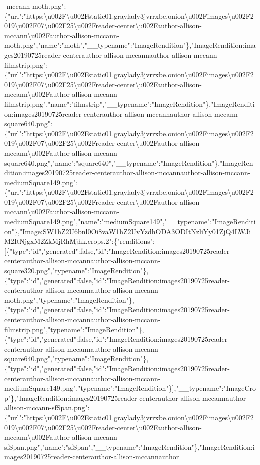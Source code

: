 -mccann-moth.png":\{"url":"https:\textbackslash{}u002F\textbackslash{}u002Fstatic01.graylady3jvrrxbe.onion\textbackslash{}u002Fimages\textbackslash{}u002F2019\textbackslash{}u002F07\textbackslash{}u002F25\textbackslash{}u002Freader-center\textbackslash{}u002Fauthor-allison-mccann\textbackslash{}u002Fauthor-allison-mccann-moth.png","name":"moth","\_\_typename":"ImageRendition"\},"ImageRendition:images20190725reader-centerauthor-allison-mccannauthor-allison-mccann-filmstrip.png":\{"url":"https:\textbackslash{}u002F\textbackslash{}u002Fstatic01.graylady3jvrrxbe.onion\textbackslash{}u002Fimages\textbackslash{}u002F2019\textbackslash{}u002F07\textbackslash{}u002F25\textbackslash{}u002Freader-center\textbackslash{}u002Fauthor-allison-mccann\textbackslash{}u002Fauthor-allison-mccann-filmstrip.png","name":"filmstrip","\_\_typename":"ImageRendition"\},"ImageRendition:images20190725reader-centerauthor-allison-mccannauthor-allison-mccann-square640.png":\{"url":"https:\textbackslash{}u002F\textbackslash{}u002Fstatic01.graylady3jvrrxbe.onion\textbackslash{}u002Fimages\textbackslash{}u002F2019\textbackslash{}u002F07\textbackslash{}u002F25\textbackslash{}u002Freader-center\textbackslash{}u002Fauthor-allison-mccann\textbackslash{}u002Fauthor-allison-mccann-square640.png","name":"square640","\_\_typename":"ImageRendition"\},"ImageRendition:images20190725reader-centerauthor-allison-mccannauthor-allison-mccann-mediumSquare149.png":\{"url":"https:\textbackslash{}u002F\textbackslash{}u002Fstatic01.graylady3jvrrxbe.onion\textbackslash{}u002Fimages\textbackslash{}u002F2019\textbackslash{}u002F07\textbackslash{}u002F25\textbackslash{}u002Freader-center\textbackslash{}u002Fauthor-allison-mccann\textbackslash{}u002Fauthor-allison-mccann-mediumSquare149.png","name":"mediumSquare149","\_\_typename":"ImageRendition"\},"Image:SW1hZ2U6bnl0Oi8vaW1hZ2UvYzdhODA3ODItNzliYy01ZjQ4LWJiM2ItNjgxM2ZkMjRhMjhk.crops.2":\{"renditions":{[}\{"type":"id","generated":false,"id":"ImageRendition:images20190725reader-centerauthor-allison-mccannauthor-allison-mccann-square320.png","typename":"ImageRendition"\},\{"type":"id","generated":false,"id":"ImageRendition:images20190725reader-centerauthor-allison-mccannauthor-allison-mccann-moth.png","typename":"ImageRendition"\},\{"type":"id","generated":false,"id":"ImageRendition:images20190725reader-centerauthor-allison-mccannauthor-allison-mccann-filmstrip.png","typename":"ImageRendition"\},\{"type":"id","generated":false,"id":"ImageRendition:images20190725reader-centerauthor-allison-mccannauthor-allison-mccann-square640.png","typename":"ImageRendition"\},\{"type":"id","generated":false,"id":"ImageRendition:images20190725reader-centerauthor-allison-mccannauthor-allison-mccann-mediumSquare149.png","typename":"ImageRendition"\}{]},"\_\_typename":"ImageCrop"\},"ImageRendition:images20190725reader-centerauthor-allison-mccannauthor-allison-mccann-sfSpan.png":\{"url":"https:\textbackslash{}u002F\textbackslash{}u002Fstatic01.graylady3jvrrxbe.onion\textbackslash{}u002Fimages\textbackslash{}u002F2019\textbackslash{}u002F07\textbackslash{}u002F25\textbackslash{}u002Freader-center\textbackslash{}u002Fauthor-allison-mccann\textbackslash{}u002Fauthor-allison-mccann-sfSpan.png","name":"sfSpan","\_\_typename":"ImageRendition"\},"ImageRendition:images20190725reader-centerauthor-allison-mccannauthor